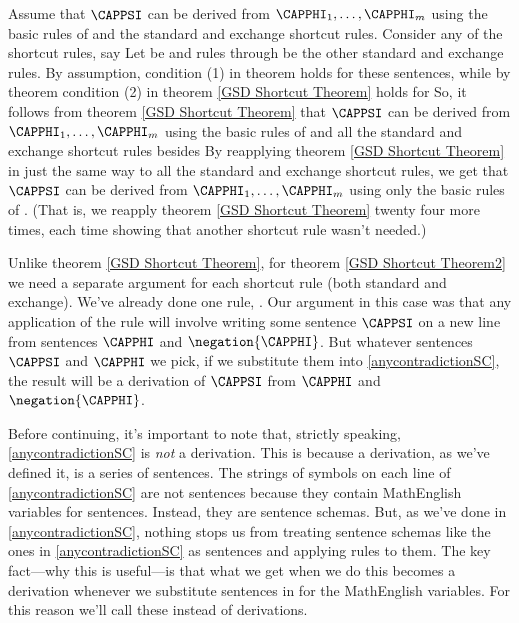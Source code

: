 \begin{PROOF}
Assume that $\CAPPSI$ can be derived from $\CAPPHI_1,\ldots,\CAPPHI_{\integer{m}}$ using the basic rules of \GSD{} and the standard and exchange shortcut rules. 
Consider any of the shortcut rules, say  
Let  be  and rules  through  be the other standard and exchange rules.
By assumption, condition (1) in theorem  holds for these sentences, while by theorem  condition (2) in theorem \ref{GSD Shortcut Theorem} holds for  
So, it follows from theorem \ref{GSD Shortcut Theorem} that $\CAPPSI$ can be derived from $\CAPPHI_1,\ldots,\CAPPHI_{\integer{m}}$ using the basic rules of \GSD{} and all the standard and exchange shortcut rules besides  By reapplying theorem \ref{GSD Shortcut Theorem} in just the same way to all the standard and exchange shortcut rules, we get that $\CAPPSI$ can be derived from $\CAPPHI_1,\ldots,\CAPPHI_{\integer{m}}$ using only the basic rules of \GSD{}. 
(That is, we reapply theorem \ref{GSD Shortcut Theorem} twenty four more times, each time showing that another shortcut rule wasn't needed.)
\end{PROOF}

\bigskip
\noindent{}Unlike theorem \ref{GSD Shortcut Theorem}, for theorem \ref{GSD Shortcut Theorem2} we need a separate argument for each shortcut rule (both standard and exchange). 
We've already done one rule, . 
Our argument in this case was that any application of the rule will involve writing some sentence $\CAPPSI$ on a new line from sentences $\CAPPHI$ and $\negation{\CAPPHI}$. 
But whatever sentences $\CAPPSI$ and $\CAPPHI$ we pick, if we substitute them into \ref{anycontradictionSC}, the result will be a derivation of $\CAPPSI$ from $\CAPPHI$ and $\negation{\CAPPHI}$. 

Before continuing, it's important to note that, strictly speaking, \ref{anycontradictionSC} is \emph{not} a derivation. 
This is because a derivation, as we've defined it, is a series of \GSL{} sentences. 
The strings of symbols on each line of \ref{anycontradictionSC} are not \GSL{} sentences because they contain MathEnglish variables for \GSL{} sentences. 
Instead, they are sentence schemas.
But, as we've done in \ref{anycontradictionSC}, nothing stops us from treating sentence schemas like the ones in \ref{anycontradictionSC} as \GSL{} sentences and applying rules to them. 
The key fact---why this is useful---is that what we get when we do this becomes a derivation whenever we substitute \GSL{} sentences in for the MathEnglish variables. 
For this reason we'll call these   instead of derivations. 

